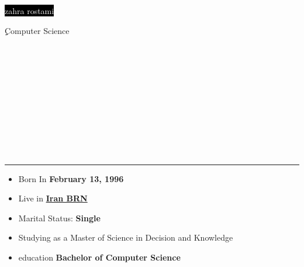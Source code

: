 \documentclass[8pt]{developercv}
\begin{document}
\begin{minipage}[t]{0.50\textwidth} 
	\vspace{-\baselineskip} 
	\vspace{5pt}
	\colorbox{black}{\Huge{\textcolor{white}{zahra rostami}}}
	\vspace{5pt}

	{\LARGE {\color{gray}ِِComputer Science}} 

\end{minipage}
\\
\begin{minipage}[t]{0.25\textwidth} 
	\vspace{-\baselineskip}
	\vspace{20pt}
	\\\\
	\\\\
          \\\\
	\\\\

\end{minipage}
\vspace{0.5cm}

\noindent\rule{\textwidth}{1pt}

\vspace{15pt} 

\begin{minipage}[t]{0.5\textwidth} 
	\vspace{-\baselineskip} 

	\Large {
	\begin{itemize}
		\item {Born In \textbf{February 13, 1996}}
		\item {Live in
		\href{Iiran,+Iran}
		{\textbf{Iran BRN}}}
		\item {Marital Status: \textbf{Single} }
                     \item{Studying as a Master of Science in Decision and Knowledge}
                     \item{education \textbf{Bachelor of Computer Science }}
	\end{itemize}
	}

\end{minipage}
\hfill 
\begin{minipage}[t]{0.4\textwidth} 
	\vspace{-\baselineskip} 
	\begin{barchart}{4.5}
	\end{barchart}
\end{minipage}
\end{document}
